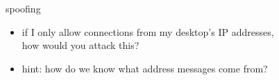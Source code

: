 \begin{frame}{spoofing}
    \begin{itemize}
    \item if I only allow connections from my desktop's IP addresses, \\
        how would you attack this?
    \vspace{.5cm}
    \item hint: how do we know what address messages come from?
    \end{itemize}
\end{frame}
